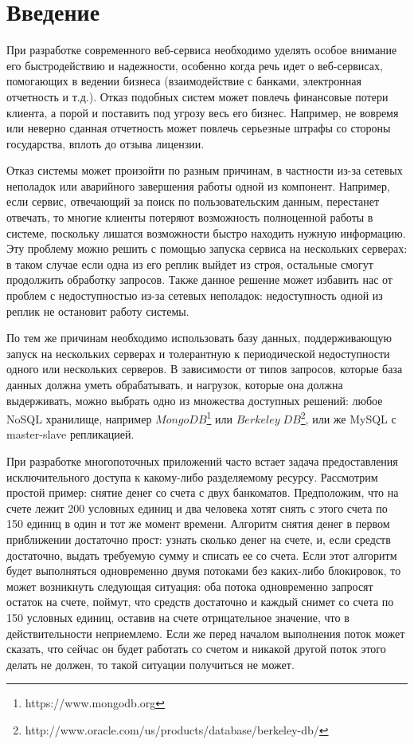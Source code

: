 \section{Введение}

При разработке современного веб-сервиса необходимо уделять особое внимание его быстродействию и надежности, особенно когда речь идет о веб-сервисах, помогающих в ведении бизнеса (взаимодействие с банками, электронная отчетность и т.д.). Отказ подобных систем может повлечь финансовые потери клиента, а порой и поставить под угрозу весь его бизнес. Например, не вовремя или неверно сданная отчетность может повлечь серьезные штрафы со стороны государства, вплоть до отзыва лицензии.

Отказ системы может произойти по разным причинам, в частности из-за сетевых неполадок или аварийного завершения работы одной из компонент. Например, если сервис, отвечающий за поиск по пользовательским данным, перестанет отвечать, то многие клиенты потеряют возможность полноценной работы в системе, поскольку лишатся возможности быстро находить нужную информацию. Эту проблему можно решить с помощью запуска сервиса на нескольких серверах: в таком случае если одна из его реплик выйдет из строя, остальные смогут продолжить обработку запросов. Также данное решение может избавить нас от проблем с недоступностью из-за сетевых неполадок: недоступность одной из реплик не остановит работу системы.

По тем же причинам необходимо использовать базу данных, поддерживающую запуск на нескольких серверах и толерантную к периодической недоступности одного или нескольких серверов. В зависимости от типов запросов, которые база данных должна уметь обрабатывать, и нагрузок, которые она должна выдерживать, можно выбрать одно из множества доступных решений: любое NoSQL хранилище, например $MongoDB$\footnote{https://www.mongodb.org} или $Berkeley\;DB$\footnote{http://www.oracle.com/us/products/database/berkeley-db/}, или же MySQL с master-slave репликацией.

При разработке многопоточных приложений часто встает задача предоставления исключительного доступа к какому-либо разделяемому ресурсу. Рассмотрим простой пример: снятие денег со счета с двух банкоматов. Предположим, что на счете лежит 200 условных единиц и два человека хотят снять с этого счета по 150 единиц в один и тот же момент времени. Алгоритм снятия денег в первом приближении достаточно прост: узнать сколько денег на счете, и, если средств достаточно, выдать требуемую сумму и списать ее со счета. Если этот алгоритм будет выполняться одновременно двумя потоками без каких-либо блокировок, то может возникнуть следующая ситуация: оба потока одновременно запросят остаток на счете, поймут, что средств достаточно и каждый снимет со счета по 150 условных единиц, оставив на счете отрицательное значение, что в действительности неприемлемо. Если же перед началом выполнения поток может сказать, что сейчас он будет работать со счетом и никакой другой поток этого делать не должен, то такой ситуации получиться не может.

